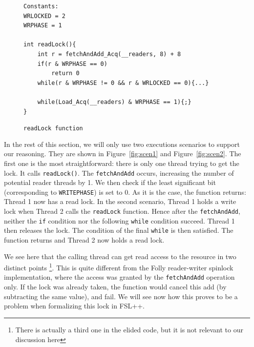 \begin{figure}
		\begin{lstlisting}
Constants:
WRLOCKED = 2
WRPHASE = 1

int readLock(){
	int r = fetchAndAdd_Acq(__readers, 8) + 8
	if(r & WRPHASE == 0)
		return 0
	while(r & WRPHASE != 0 && r & WRLOCKED == 0){...}

	while(Load_Acq(__readers) & WRPHASE == 1){;}
}

	\end{lstlisting}
	\caption{\texttt{readLock function}}
	\label{fig:codeglibc}
\end{figure}
In the rest of this section, we will only use two executions scenarios to support our reasoning. They are shown in Figure~\ref{fig:scen1} and Figure~\ref{fig:scen2}. The first one is the most straightforward: there is only one thread trying to get the lock. It calls \texttt{readLock()}. The \texttt{fetchAndAdd} occurs, increasing the number of potential reader threads by 1. We then check if the least significant bit (corresponding to \texttt{WRITEPHASE}) is set to 0. As it is the case, the function returns: Thread 1 now has a read lock. In the second scenario, Thread 1 holds a write lock when Thread 2 calls the \texttt{readLock} function. Hence after the \texttt{fetchAndAdd}, neither the \texttt{if} condition nor the following \texttt{while} condition succeed. Thread 1 then releases the lock. The condition of the final \texttt{while} is then satisfied. The function returns and Thread 2 now holds a read lock.

We see here that the calling thread can get read access to the resource in two distinct points \footnote{There is actually a third one in the elided code, but it is not relevant to our discussion here}. This is quite different from the Folly reader-writer spinlock implementation, where the access was granted by the \texttt{fetchAndAdd} operation only. If the lock was already taken, the function would cancel this add (by subtracting the same value), and fail. We will see now how this proves to be a problem when formalizing this lock in FSL++.


